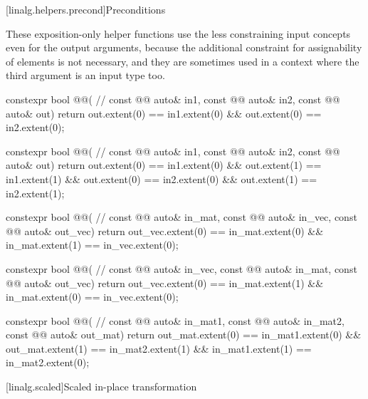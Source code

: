 [linalg.helpers.precond]{Preconditions}

\pnum
\begin{note}
These exposition-only helper functions use
the less constraining input concepts even for the output arguments,
because the additional constraint for assignability of elements
is not necessary, and
they are sometimes used in a context
where the third argument is an input type too.
\end{note}

\begin{codeblock}
constexpr bool @@(                                          // \expos
  const @@ auto& in1, const @@ auto& in2, const @@ auto& out) {
  return out.extent(0) == in1.extent(0) && out.extent(0) == in2.extent(0);
}

constexpr bool @@(                                          // \expos
  const @@ auto& in1,  const @@ auto& in2, const @@ auto& out) {
  return out.extent(0) == in1.extent(0) && out.extent(1) == in1.extent(1) &&
         out.extent(0) == in2.extent(0) && out.extent(1) == in2.extent(1);
}

constexpr bool @@(                                     // \expos
  const @@ auto& in_mat, const @@ auto& in_vec, const @@ auto& out_vec) {
  return out_vec.extent(0) == in_mat.extent(0) && in_mat.extent(1) == in_vec.extent(0);
}

constexpr bool @@( // \expos
  const @@ auto& in_vec, const @@ auto& in_mat, const @@ auto& out_vec) {
  return out_vec.extent(0) == in_mat.extent(1) && in_mat.extent(0) == in_vec.extent(0);
}

constexpr bool @@(                                     // \expos
  const @@ auto& in_mat1, const @@ auto& in_mat2, const @@ auto& out_mat) {
  return out_mat.extent(0) == in_mat1.extent(0) && out_mat.extent(1) == in_mat2.extent(1) &&
         in_mat1.extent(1) == in_mat2.extent(0);
}
\end{codeblock}

[linalg.scaled]{Scaled in-place transformation}

